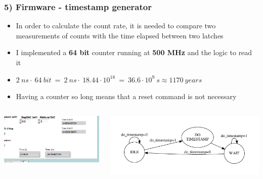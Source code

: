 \documentclass[aspectratio=169]{beamer}
\begin{document}
	\begin{frame}
		\frametitle{5) Firmware - timestamp generator}
		\begin{itemize}
			\item In order to calculate the count rate, it is needed to compare two measurements of
			counts with the time elapsed between two latches
			\item I implemented a \textbf{64 bit} counter running at \textbf{500 MHz} and the logic to read it
			\item $2 \: ns \cdot \: 64 \: bit \: =\: 2 \: ns \cdot \: 18.44\cdot10^{18} \: = \: 36.6\cdot10^{9} \: s \approx 1170 \: years$
			\item Having a counter so long means that a reset command is not necessary 
		\end{itemize}
		\begin{columns}		
			\begin{center}
				\includegraphics[width=0.8 \textwidth]{IMG2/fig15}
			\end{center}
			\begin{center}
				\includegraphics[width=1.0 \textwidth]{IMG2/TimestampFSM}
			\end{center}
		\end{columns}
	\end{frame}
\end{document}
